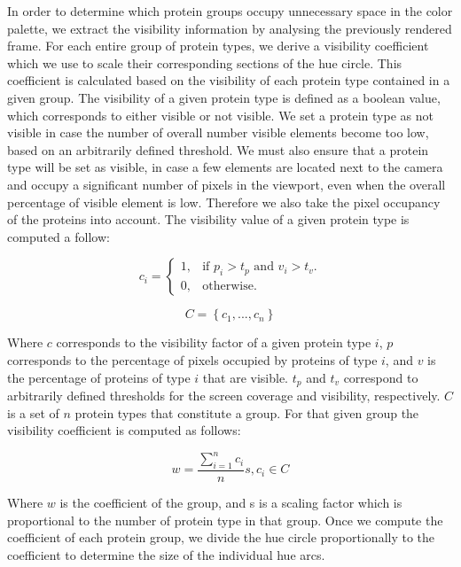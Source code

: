 \documentclass[review,journal]{vgtc}         %
\begin{document}
In order to determine which protein groups occupy unnecessary space in the color palette, we extract the visibility information by analysing the previously rendered frame.
For each entire group of protein types, we derive a visibility coefficient which we use to scale their corresponding sections of the hue circle. 
This coefficient is calculated based on the visibility of each protein type contained in a given group.
The visibility of a given protein type is defined as a boolean value, which corresponds to either visible or not visible.
We set a protein type as not visible in case the number of overall number visible elements become too low, based on an arbitrarily defined threshold.
We must also ensure that a protein type will be set as visible, in case a few elements are located next to the camera and occupy a significant number of pixels in the viewport, even when the overall percentage of visible element is low.
Therefore we also take the pixel occupancy of the proteins  into account.
The visibility value of a given protein type is computed a follow:

\begin{equation}
c_{i}=\begin{cases}
1, & \text{if $p_{i}>t_{p}$ and $v_{i}>t_{v}$}.\\
0, & \text{otherwise}.
\end{cases}
\end{equation}

\begin{equation}
C = \left\lbrace c_{1}, ... , c_{n} \right\rbrace 
\end{equation}

Where $c$ corresponds to the visibility factor of a given protein type $i$, $p$ corresponds to the percentage of pixels occupied by proteins of type $i$, and $v$ is the percentage of proteins of type $i$ that are visible.
$t_{p}$ and $t_{v}$ correspond to arbitrarily defined thresholds for the screen coverage and visibility, respectively. 
$C$ is a set of $n$ protein types that constitute a group.
For that given group the visibility coefficient is computed as follows:

\begin{equation}
w = \frac{\sum_{i=1}^{n} c_{i}}{n} s, c_{i} \in C
\end{equation}

Where $w$ is the coefficient of the group, and s is a scaling factor which is proportional to the number of protein type in that group. 
Once we compute the coefficient of each protein group, we divide the hue circle proportionally to the coefficient to determine the size of the individual hue arcs. \\
\end{document}
